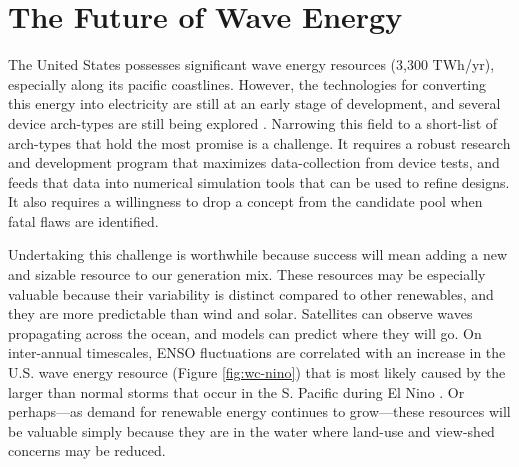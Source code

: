 \section{The Future of Wave Energy}

The United States possesses significant wave energy resources (3,300 TWh/yr), especially along its pacific coastlines. However, the technologies for converting this energy into electricity are still at an early stage of development, and several device arch-types are still being explored \cite{babaritOceanWaveEnergy2017}. Narrowing this field to a short-list of arch-types that hold the most promise is a challenge. It requires a robust research and development program that maximizes data-collection from device tests, and feeds that data into numerical simulation tools that can be used to refine designs. It also requires a willingness to drop a concept from the candidate pool when fatal flaws are identified.

Undertaking this challenge is worthwhile because success will mean adding a new and sizable resource to our generation mix. These resources may be especially valuable because their variability is distinct compared to other renewables, and they are more predictable than wind and solar. Satellites can observe waves propagating across the ocean, and models can predict where they will go. On inter-annual timescales, ENSO fluctuations are correlated with an increase in the U.S. wave energy resource (Figure \ref{fig:wc-nino}) that is most likely caused by the larger than normal storms that occur in the S. Pacific during El Nino \citep{andersonClimateIndexOptimized2018, yangCharacteristicsVariabilityNearshore2020, ruggieroNationalAssessmentShoreline2013}. Or perhaps—as demand for renewable energy continues to grow—these resources will be valuable simply because they are in the water where land-use and view-shed concerns may be reduced.






